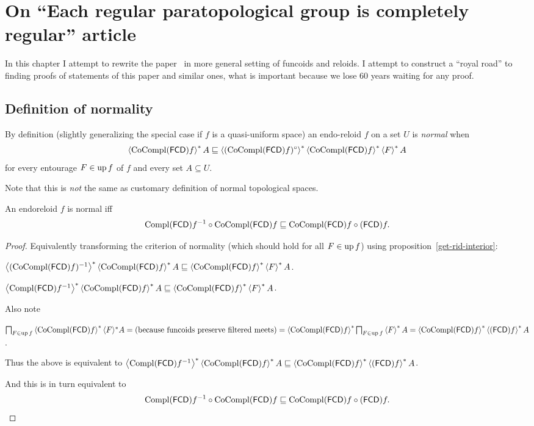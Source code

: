 \chapter{On ``Each regular paratopological group is completely regular'' article}

In this chapter I attempt to rewrite the paper~\cite{2014arXiv1410.1504B} in more general setting of funcoids and reloids.
I attempt to construct a ``royal road'' to finding proofs of statements of this paper and similar ones, what is
important because we lose 60 years waiting for any proof.

\section{Definition of normality}

By definition (slightly generalizing the special case if $f$ is a
quasi-uniform space) an endo-reloid $f$ on a set $U$ is \emph{normal} when
\[ \left\langle \operatorname{CoCompl} (\mathsf{FCD}) f\right\rangle ^{\ast} A \sqsubseteq \left\langle 
(\operatorname{CoCompl} (\mathsf{FCD}) f)^{\circ}\right\rangle ^{\ast} \left\langle \operatorname{CoCompl} (\mathsf{FCD})
f \right\rangle ^{\ast} \left\langle F\right\rangle ^{\ast} A \] for every entourage $F \in
\operatorname{up} f$ of $f$ and every set $A \subseteq U$.

Note that this is \emph{not} the same as customary definition of normal topological spaces.

\begin{thm}
  An endoreloid $f$ is normal iff
  \[ \operatorname{Compl} (\mathsf{FCD}) f^{- 1} \circ \operatorname{CoCompl} (\mathsf{FCD}) f \sqsubseteq
  \operatorname{CoCompl} (\mathsf{FCD}) f \circ (\mathsf{FCD}) f. \]
\end{thm}

\begin{proof}
  Equivalently transforming the criterion of normality (which should hold for
  all $F \in \operatorname{up} f$) using proposition~\ref{get-rid-interior}:

  $\left\langle (\operatorname{CoCompl} (\mathsf{FCD}) f)^{- 1}\right\rangle ^{\ast}
  \left\langle \operatorname{CoCompl} (\mathsf{FCD}) f\right\rangle ^{\ast} A \sqsubseteq
  \left\langle \operatorname{CoCompl} (\mathsf{FCD}) f\right\rangle ^{\ast} \left\langle F\right\rangle ^{\ast} A$.

  $\left\langle \operatorname{Compl} (\mathsf{FCD}) f^{- 1}\right\rangle ^{\ast}
  \left\langle \operatorname{CoCompl} (\mathsf{FCD}) f\right\rangle ^{\ast} A \sqsubseteq
  \left\langle \operatorname{CoCompl} (\mathsf{FCD}) f\right\rangle ^{\ast} \left\langle F\right\rangle ^{\ast} A$.

  Also note
  
  $\bigsqcap_{F \in \operatorname{up} f} \left\langle  \operatorname{CoCompl} (\mathsf{FCD}) f
  \right\rangle ^{\ast} \langle F \rangle^{\ast} A = \text{(because funcoids preserve
  filtered meets)} = \left\langle  \operatorname{CoCompl} (\mathsf{FCD}) f
  \right\rangle ^{\ast}  \bigsqcap_{F \in \operatorname{up} f} \left\langle F\right\rangle ^{\ast} A =
  \left\langle  \operatorname{CoCompl} (\mathsf{FCD}) f \right\rangle ^{\ast}
  \left\langle  (\mathsf{FCD}) f \right\rangle ^{\ast} A$.

  Thus the above is equivalent to
  $\left\langle \operatorname{Compl} (\mathsf{FCD}) f^{- 1}\right\rangle ^{\ast}
  \left\langle \operatorname{CoCompl} (\mathsf{FCD}) f\right\rangle ^{\ast} A \sqsubseteq
  \left\langle  \operatorname{CoCompl} (\mathsf{FCD}) f \right\rangle ^{\ast}
  \left\langle  (\mathsf{FCD}) f \right\rangle ^{\ast} A$.

  And this is in turn equivalent to
  \[ \operatorname{Compl} (\mathsf{FCD}) f^{- 1} \circ \operatorname{CoCompl} (\mathsf{FCD}) f \sqsubseteq
  \operatorname{CoCompl} (\mathsf{FCD}) f \circ (\mathsf{FCD}) f. \]
\end{proof}

